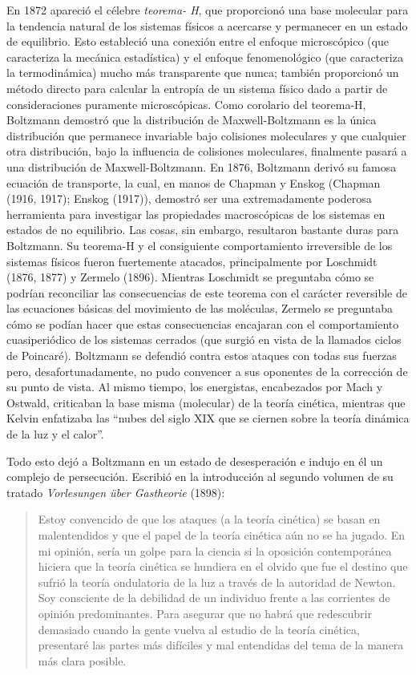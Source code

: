 En 1872 apareció el célebre \emph{teorema- H}, que proporcionó una base molecular para la tendencia natural de los sistemas físicos a acercarse y permanecer en un estado de equilibrio. Esto estableció una conexión entre el enfoque microscópico (que caracteriza la mecánica estadística) y el enfoque fenomenológico (que caracteriza la termodinámica) mucho más transparente que nunca; también proporcionó un método directo para calcular la entropía de un sistema físico dado a partir de consideraciones puramente microscópicas. Como corolario del teorema-H, Boltzmann demostró que la distribución de Maxwell-Boltzmann es la única distribución que permanece invariable bajo colisiones moleculares y que cualquier otra distribución, bajo la influencia de colisiones moleculares, finalmente pasará a una distribución de Maxwell-Boltzmann. En 1876, Boltzmann derivó su famosa ecuación de transporte, la cual, en manos de Chapman y Enskog (Chapman (1916, 1917); Enskog (1917)), demostró ser una extremadamente poderosa herramienta para investigar las propiedades macroscópicas de los sistemas en estados de no equilibrio. Las cosas, sin embargo, resultaron bastante duras para Boltzmann. Su teorema-H y el consiguiente comportamiento irreversible de los sistemas físicos fueron fuertemente atacados, principalmente por Loschmidt (1876, 1877) y Zermelo (1896). Mientras Loschmidt se preguntaba cómo se podrían reconciliar las consecuencias de este teorema con el carácter reversible de las ecuaciones básicas del movimiento de las moléculas, Zermelo se preguntaba cómo se podían hacer que estas consecuencias encajaran con el comportamiento cuasiperiódico de los sistemas cerrados (que surgió en vista de la llamados ciclos de Poincaré). Boltzmann se defendió contra estos ataques con todas sus fuerzas pero, desafortunadamente, no pudo convencer a sus oponentes de la corrección de su punto de vista. Al mismo tiempo, los energistas, encabezados por Mach y Ostwald, criticaban la base misma (molecular) de la teoría cinética, mientras que Kelvin enfatizaba las \enquote{nubes del siglo XIX que se ciernen sobre la teoría dinámica de la luz y el calor}.
\par
Todo esto dejó a Boltzmann en un estado de desesperación e indujo en él un complejo de persecución. Escribió en la introducción al segundo volumen de su tratado \emph{Vorlesungen über Gastheorie} (1898):
\begin{quote}
Estoy convencido de que los ataques (a la teoría cinética) se basan en malentendidos y que el papel de la teoría cinética aún no se ha jugado. En mi opinión, sería un golpe para la ciencia si la oposición contemporánea hiciera que la teoría cinética se hundiera en el olvido que fue el destino que sufrió la teoría ondulatoria de la luz a través de la autoridad de Newton. Soy consciente de la debilidad de un individuo frente a las corrientes de opinión predominantes. Para asegurar que no habrá que redescubrir demasiado cuando la gente vuelva al estudio de la teoría cinética, presentaré las partes más difíciles y mal entendidas del tema de la manera más clara posible.
\end{quote}

